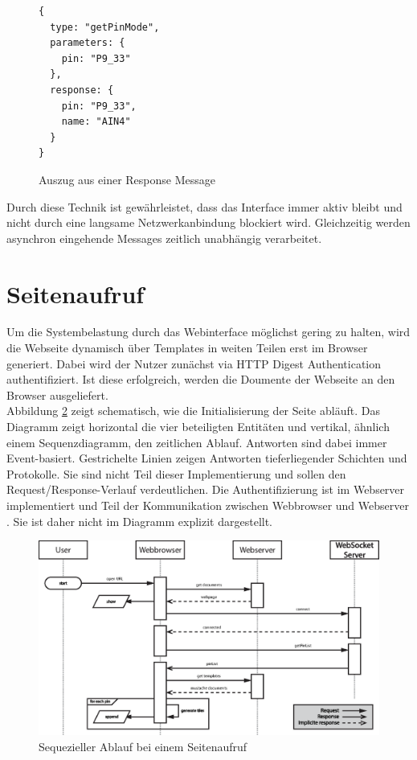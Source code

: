 \begin{figure}[ht]
\begin{lstlisting}
{
  type: "getPinMode",
  parameters: {
    pin: "P9_33"
  },
  response: {
    pin: "P9_33",
    name: "AIN4"
  }
}
\end{lstlisting}
\caption{Auszug aus einer Response Message}
\label{lst:responseMessage}
\end{figure}

Durch diese Technik ist gewährleistet, dass das Interface immer aktiv bleibt und nicht durch eine langsame Netzwerkanbindung blockiert wird. Gleichzeitig werden asynchron eingehende Messages zeitlich unabhängig verarbeitet.

\section{Seitenaufruf}
Um die Systembelastung durch das Webinterface möglichst gering zu halten, wird die Webseite dynamisch über Templates in weiten Teilen erst im Browser generiert. Dabei wird der Nutzer zunächst via HTTP Digest Authentication authentifiziert. Ist diese erfolgreich, werden die Doumente der Webseite an den Browser ausgeliefert.\\

Abbildung \ref{fig:pageloadSequence} zeigt schematisch, wie die Initialisierung der Seite abläuft. Das Diagramm zeigt horizontal die vier beteiligten Entitäten und vertikal, ähnlich einem Sequenzdiagramm, den zeitlichen Ablauf. Antworten sind dabei immer Event-basiert. Gestrichelte Linien zeigen Antworten tieferliegender Schichten und Protokolle. Sie sind nicht Teil dieser Implementierung und sollen den Request/Response-Verlauf verdeutlichen. Die Authentifizierung ist im Webserver implementiert und Teil der Kommunikation zwischen Webbrowser und Webserver \cite{rfc7235}. Sie ist daher nicht im Diagramm explizit dargestellt.

\begin{figure}[ht]
  \centering
  \includegraphics[width = \textwidth]{documentation/images/pageload.eps}
  \caption{Sequezieller Ablauf bei einem Seitenaufruf}
  \label{fig:pageloadSequence}
\end{figure}


